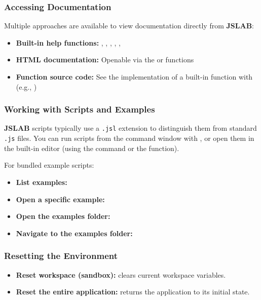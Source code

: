 \documentclass[12pt,a4paper]{article}
\begin{document}
\subsubsection{Accessing Documentation}
Multiple approaches are available to view documentation directly from \textbf{JSLAB}:
\begin{itemize}
  \item \textbf{Built-in help functions:} , , , , , 
  \item \textbf{HTML documentation:} Openable via the  or  functions
  \item \textbf{Function source code:} See the implementation of a built-in function with  (e.g., )
\end{itemize}

\subsubsection{Working with Scripts and Examples}
\textbf{JSLAB} scripts typically use a \texttt{.jsl} extension to distinguish them from standard \texttt{.js} files. You can run scripts from the command window with , or open them in the built-in editor (using the  command or the  function).

For bundled example scripts:
\begin{itemize}
  \item \textbf{List examples:} 
  \item \textbf{Open a specific example:} 
  \item \textbf{Open the examples folder:} 
  \item \textbf{Navigate to the examples folder:} 
\end{itemize}

\subsubsection{Resetting the Environment}
\begin{itemize}
  \item \textbf{Reset workspace (sandbox):}  clears current workspace variables.
  \item \textbf{Reset the entire application:}  returns the application to its initial state.
\end{itemize}
\end{document}
